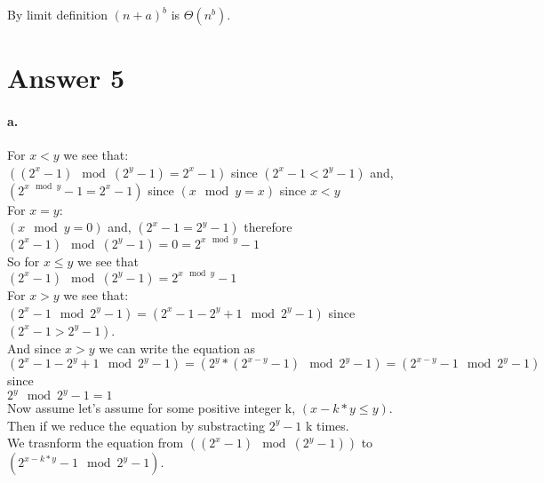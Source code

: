 \documentclass[11pt]{article}
\begin{document}
By limit definition $(n+a)^b$ is $\Theta(n^b)$.\\

\section*{Answer 5}

\paragraph{a.}

For $x < y$ we see that:\\

$((2^x- 1) \mod (2^y - 1)  = 2^x - 1)$ since $(2^x - 1 < 2^y - 1)$ and,\\

$(2^{x \mod y} - 1 = 2^x - 1)$ since $(x \mod y = x)$ since $x < y$\\

For $x = y$:\\

$(x \mod y = 0)$ and, $(2^x - 1 = 2^y - 1)$ therefore\\

$(2^x - 1) \mod (2^y - 1) = 0 = 2^{x \mod y} - 1$\\

So for $x \le y$ we see that\\

$(2^x - 1) \mod (2^y - 1) = 2^{x \mod y} - 1$\\

For $x > y$ we see that:\\

$(2^x - 1 \mod 2^y -1) = (2^x - 1 - 2^y + 1 \mod 2^y - 1)$ since $(2^x - 1 > 2^y - 1)$.\\

And since $x > y$ we can write the equation as\\

$(2^x - 1 - 2^y + 1 \mod 2^y -1) = (2^y*(2^{x-y} - 1) \mod 2^y - 1) = (2^{x-y} - 1 \mod 2^y -1)$ since\\ 

$2^y \mod 2^y - 1 = 1$\\

Now assume let's assume for some positive integer k, $(x - k*y \le y)$.\\

Then if we reduce the equation by substracting $2^y -1$ k times.\\

We trasnform the equation from $((2^x- 1) \mod (2^y - 1))$ to $(2^{x-k*y} - 1 \mod 2^y - 1)$.\\
\end{document}
